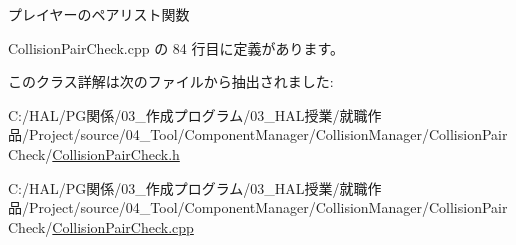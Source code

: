 プレイヤーのペアリスト関数 



 Collision\+Pair\+Check.\+cpp の 84 行目に定義があります。



このクラス詳解は次のファイルから抽出されました\+:\begin{DoxyCompactItemize}
\item 
C\+:/\+H\+A\+L/\+P\+G関係/03\+\_\+作成プログラム/03\+\_\+\+H\+A\+L授業/就職作品/\+Project/source/04\+\_\+\+Tool/\+Component\+Manager/\+Collision\+Manager/\+Collision\+Pair\+Check/\mbox{\hyperlink{_collision_pair_check_8h}{Collision\+Pair\+Check.\+h}}\item 
C\+:/\+H\+A\+L/\+P\+G関係/03\+\_\+作成プログラム/03\+\_\+\+H\+A\+L授業/就職作品/\+Project/source/04\+\_\+\+Tool/\+Component\+Manager/\+Collision\+Manager/\+Collision\+Pair\+Check/\mbox{\hyperlink{_collision_pair_check_8cpp}{Collision\+Pair\+Check.\+cpp}}\end{DoxyCompactItemize}
